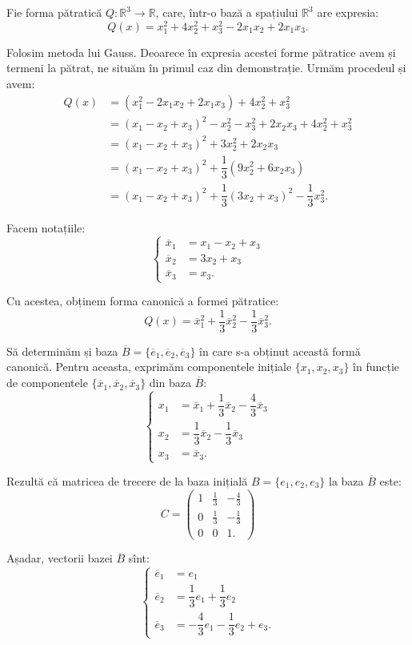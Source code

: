 \begin{example}
	Fie forma pătratică $Q : \mathbb{R}^3 \to \mathbb{R}$, care, într-o bază
a spațiului $\mathbb{R}^3$ are expresia: 
 \[
	Q(x) = x_1^2 + 4x_2^2 + x_3^2 - 2x_1 x_2 + 2x_1 x_3.
\]

Folosim metoda lui Gauss. Deoarece în expresia acestei forme pătratice avem și
termeni la pătrat, ne situăm în primul caz din demonstrație. Urmăm procedeul
și avem:
\begin{align*}
Q(x) &= (x_1^2 - 2x_1 x_2 + 2x_1 x_3) + 4x_2^2 + x_3^2 \\
     &= (x_1 - x_2 + x_3)^2 - x_2^2 - x_3^2 + 2x_2 x_3 + 4x_2^2 + x_3^2 \\
     &= (x_1 - x_2 + x_3)^2 + 3x_2^2 + 2x_2 x_3 \\
     &= (x_1 - x_2 + x_3)^2 + \dfrac{1}{3} (9x_2^2 + 6x_2 x_3) \\
     &= (x_1 - x_2 + x_3)^2 + \dfrac{1}{3} (3x_2 + x_3)^2 - \dfrac{1}{3} x_3^2.
\end{align*}

Facem notațiile: 
 \[
	\begin{cases}	
	    \overline{x}_1 &= x_1 - x_2 + x_3 \\
	    \overline{x}_2 &= 3x_2 + x_3 \\
	    \overline{x}_3 &= x_3.
    \end{cases}
\]

Cu acestea, obținem forma canonică a formei pătratice: 
 \[
	Q(x) = \overline{x}_1^2 + \dfrac{1}{3} \overline{x}_2^2 - \dfrac{1}{3}
	        \overline{x}_3^2.
\]

Să determinăm și baza $\overline{B} = \{\overline{e}_1, \overline{e}_2,
\overline{e}_3\}$ în care s-a obținut această formă canonică. Pentru aceasta,
exprimăm componentele inițiale $\{x_1, x_2, x_3\}$ în funcție de componentele
$\{\overline{x}_1, \overline{x}_2, \overline{x}_3\}$ din baza $\overline{B}$: 
 \[
	\begin{cases}	
	    x_1 &= \overline{x}_1 + \dfrac{1}{3} \overline{x}_2 - \dfrac{4}{3}
	            \overline{x}_3 \\
	    x_2 &= \dfrac{1}{3} \overline{x}_2 - \dfrac{1}{3} \overline{x}_3 \\
	    x_3 &= \overline{x}_3.
    \end{cases}
\]

Rezultă că matricea de trecere de la baza inițială $B = \{e_1, e_2, e_3\}$ la
baza $\overline{B}$ este: 
 \[
	C = \begin{pmatrix}
	        1 & \frac{1}{3} & -\frac{4}{3} \\
	        0 & \frac{1}{3} & -\frac{1}{3} \\
	        0 & 0 & 1.
        \end{pmatrix}
\]

Așadar, vectorii bazei $\overline{B}$ sînt: 
 \[
	\begin{cases}	
	    \overline{e}_1 &= e_1 \\
	    \overline{e}_2 &= \dfrac{1}{3} e_1 + \dfrac{1}{3} e_2 \\
	    \overline{e}_3 &= -\dfrac{4}{3} e_1 - \dfrac{1}{3} e_2 + e_3.
    \end{cases}
\]
\end{example}

